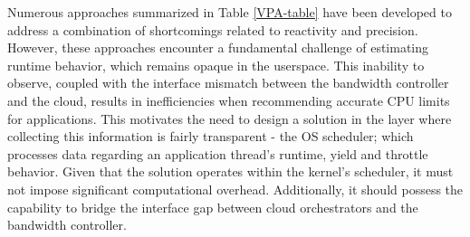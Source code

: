 



Numerous approaches summarized in Table \ref{VPA-table} have been developed to address a combination of shortcomings related to reactivity and precision. However, these approaches encounter a fundamental challenge of estimating runtime behavior, which remains opaque in the userspace. This inability to observe, coupled with the interface mismatch between the bandwidth controller and the cloud, results in inefficiencies when recommending accurate CPU limits for applications. This motivates the need to design a solution in the layer where collecting this information is fairly transparent - the OS scheduler; which processes data regarding an application thread's runtime, yield and throttle behavior. Given that the solution operates within the kernel's scheduler, it must not impose significant computational overhead. Additionally, it should possess the capability to bridge the interface gap between cloud orchestrators and the bandwidth controller.



